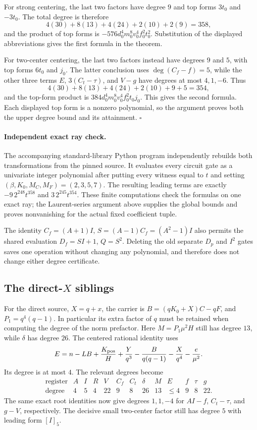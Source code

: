 For strong centering, the last two factors have degree $9$ and top forms
$3t_0$ and $-3t_0$.  The total degree is therefore
\[
 4(30)+8(13)+4(24)+2(10)+2(9)=358,
\]
and the product of top forms is
$-576d_0^4m_0^8v_0^4f_0^2t_0^2$.
Substitution of the displayed abbreviations gives the first formula in
the theorem.

For two-center centering, the last two factors instead have degrees
$9$ and $5$, with top forms $6t_0$ and $j_0$.  The latter conclusion
uses $\deg(C_f-f)=5$, while the other three terms $E$,
$3(C_t-\tau)$, and $V-g$ have degrees at most $4,1,-6$.
Thus
\[
 4(30)+8(13)+4(24)+2(10)+9+5=354,
\]
and the top-form product is
$384d_0^4m_0^8v_0^4f_0^2t_0j_0$.
This gives the second formula.  Each displayed top form is a nonzero
polynomial, so the argument proves both the upper degree bound and its
attainment. \hfill$\square$

\paragraph{Independent exact ray check.}
The accompanying standard-library Python program independently rebuilds
both transformations from the pinned source.  It evaluates every circuit
gate as a univariate integer polynomial after putting every witness
equal to $t$ and setting $(\beta,K_0,M_C,M_F)=(2,3,5,7)$.
The resulting leading terms are exactly
$-9\,2^{248}t^{358}$ and $3\,2^{245}t^{354}$.
These finite computations check the formulas on one exact ray; the
Laurent-series argument above supplies the global bounds and proves
nonvanishing for the actual fixed coefficient tuple.

The identity $C_f=(A+1)I$, $S=(A-1)C_f=(A^2-1)I$ also permits the
shared evaluation $D_f=SI+1$, $Q=S^2$.  Deleting the old separate
$D_p$ and $I^2$ gates saves one operation without changing any
polynomial, and therefore does not change either degree certificate.

\subsection{The direct-$X$ siblings}

For the direct source, $X=q+x$, the carrier is
$B=(qK_0+X)C-qF$, and
$P_1=q^4(q-1)$.  In particular its extra factor of $q$ must be retained
when computing the degree of the norm prefactor.  Here $M=P_1\mu^2H$
still has degree $13$, while $\delta$ has degree $26$.
The centered rational identity uses
\[
 E=n-LB+\frac{K_{\rm pos}}H+\frac{Y}{q^3}
       -\frac{B}{q(q-1)}-\frac{X}{q^4}-\frac e{\mu^2}.
\]
Its degree is at most $4$.  The relevant degrees become
\[
\begin{array}{c|rrrrrrrrrrrr}
\text{register}&A&I&R&V&C_f&C_t&\delta&M&E&f&\tau&g\\\hline
\text{degree}&4&5&4&22&9&8&26&13&\leq4&9&8&22.
\end{array}
\]
The same exact root identities now give degrees $1,1,-4$ for
$AI-f$, $C_t-\tau$, and $g-V$, respectively.  The decisive small
two-center factor still has degree $5$ with leading form $[I]_5$.

